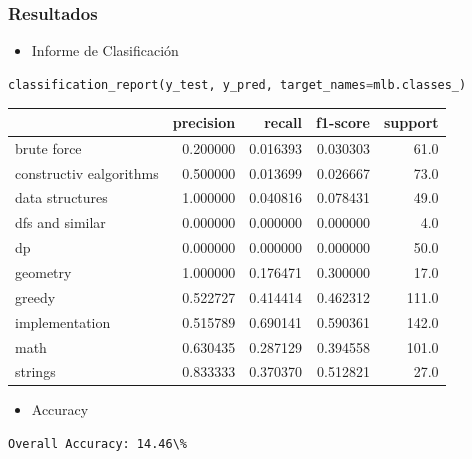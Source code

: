 \documentclass{article}
\begin{document}
\subsubsection{Resultados}
\begin{itemize}
    \item Informe de Clasificación
\end{itemize}
\begin{lstlisting}[language=Python, caption=Informe de Clasificación]
    classification_report(y_test, y_pred, target_names=mlb.classes_)
\end{lstlisting}

\begin{tabular}{lrrrr}
    \toprule
    {}                     & precision & recall   & f1-score & support \\
    \midrule
    brute force             & 0.200000  & 0.016393 & 0.030303 & 61.0    \\
    constructiv ealgorithms & 0.500000  & 0.013699 & 0.026667 & 73.0    \\
    data structures         & 1.000000  & 0.040816 & 0.078431 & 49.0    \\
    dfs and similar          & 0.000000  & 0.000000 & 0.000000 & 4.0     \\
    dp                     & 0.000000  & 0.000000 & 0.000000 & 50.0    \\
    geometry               & 1.000000  & 0.176471 & 0.300000 & 17.0    \\
    greedy                 & 0.522727  & 0.414414 & 0.462312 & 111.0   \\
    implementation         & 0.515789  & 0.690141 & 0.590361 & 142.0   \\
    math                   & 0.630435  & 0.287129 & 0.394558 & 101.0   \\
    strings                & 0.833333  & 0.370370 & 0.512821 & 27.0    \\
    \bottomrule
\end{tabular}

\begin{itemize}
    \item Accuracy
\end{itemize}
\begin{verbatim}
Overall Accuracy: 14.46\%
\end{verbatim}
\end{document}
